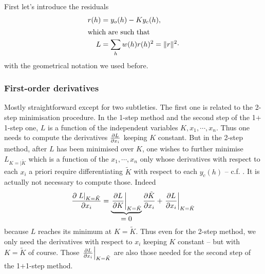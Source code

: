 \documentclass[11pt]{article}
\begin{document}
First let's introduce the residuals
\begin{align}
r(h) &= y_o(h) - K y_c(h),\\
\intertext{which are such that}
L &= \sum_h w(h) r(h)^2 = \|r\|^2 \cdot
\label{eqn:L:vector}
\end{align}
with the geometrical notation we used before.

\subsubsection{First-order derivatives}
\label{lsq:mini:all:firstorder:derivatives}

Mostly straightforward except for two subtleties. The first one is related to the 2-step minimisation procedure. In the 1-step method and the second step of the 1$+$1-step one, $L$ is a function of the independent variables $K, x_1, \cdots, x_n$. Thus one needs to compute the derivatives $\frac{\partial L}{\partial x_i}$ keeping $K$ constant. But in the 2-step method, after $L$ has been minimised over $K$, one wishes to further minimise $L_{K=|\tilde{K}}$ which is a function of the $x_1, \cdots, x_n$ only whose derivatives with respect to each $x_i$ a priori require differentiating $\tilde{K}$ with respect to each $y_c(h)$ -- c.f. . It is actually not necessary to compute those. Indeed
\begin{equation}
\frac{\partial \left. L \right|_{K=\tilde{K}}}{\partial x_i} = \underbrace{ \left.\frac{\partial L}{\partial K}\right|_{K=\tilde{K}} }_{\displaystyle = 0} \frac{\partial \tilde{K}}{\partial x_i} + \left.\frac{\partial L}{\partial x_i}\right|_{K=\tilde{K}}
\label{eqn:twostep:firstorder:der}
\end{equation}
because $L$ reaches its minimum at $K=\tilde{K}$. Thus even for the 2-step method, we only need the derivatives with respect to $x_i$ keeping $K$ constant -- but with $K=\tilde{K}$ of course. Those $\left.\frac{\partial L}{\partial x_i}\right|_{K=\tilde{K}}$ are also those needed for the second step of the 1$+$1-step method.
\end{document}
